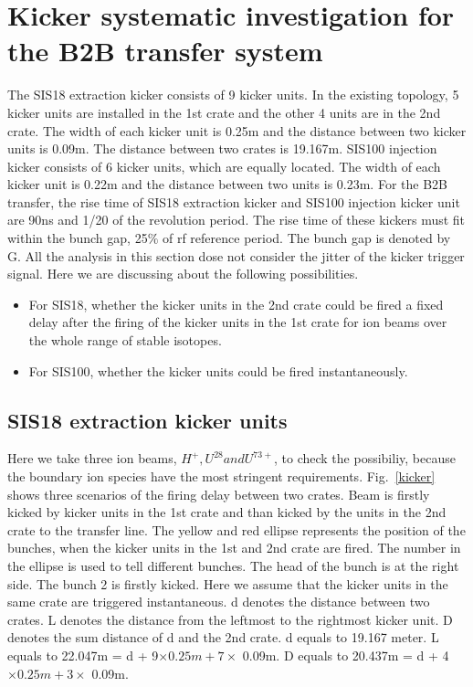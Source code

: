 \section{Kicker systematic investigation for the B2B transfer system}
The SIS18 extraction kicker consists of 9 kicker units. In the existing topology, 5 kicker units are installed in the 1st crate and the other 4 units are in the 2nd crate. The width of each kicker unit is 0.25m and the distance between two kicker units is 0.09m. The distance between two crates is 19.167m. SIS100 injection kicker consists of 6 kicker units, which are equally located. The width of each kicker unit is 0.22m and the distance between two units is 0.23m. For the B2B transfer, the rise time of SIS18 extraction kicker and SIS100 injection kicker unit are 90ns and 1/20 of the revolution period. The rise time of these kickers must fit within the bunch gap, 25$\%$ of rf reference period. The bunch gap is denoted by G. All the analysis in this section dose not consider the jitter of the kicker trigger signal. Here we are discussing about the following possibilities. 
\begin{itemize}
    \item For SIS18, whether the kicker units in the 2nd crate could be fired a fixed delay after the firing of the kicker units in the 1st crate for ion beams over the whole range of stable isotopes. 
    \item For SIS100, whether the kicker units could be fired instantaneously. 
\end{itemize} 

\subsection{SIS18 extraction kicker units}
Here we take three ion beams, $H^+, U^{28} and U^{73+}$, to check the possibiliy, because the boundary ion species have the most stringent requirements. Fig.~\ref{kicker} shows three scenarios of the firing delay between two crates. Beam is firstly kicked by kicker units in the 1st crate and than kicked by the units in the 2nd crate to the transfer line. The yellow and red ellipse represents the position of the bunches, when the kicker units in the 1st and 2nd crate are fired. The number in the ellipse is used to tell different bunches. The head of the bunch is at the right side. The bunch 2 is firstly kicked. Here we assume that the kicker units in the same crate are triggered instantaneous. d denotes the distance between two crates. L denotes the distance from the leftmost to the rightmost kicker unit. D denotes the sum distance of d and the 2nd crate. d equals to 19.167 meter. L equals to 22.047m = d + 9$\times 0.25m + 7\times$ 0.09m. D equals to 20.437m = d + 4$\times 0.25m + 3\times$ 0.09m.


